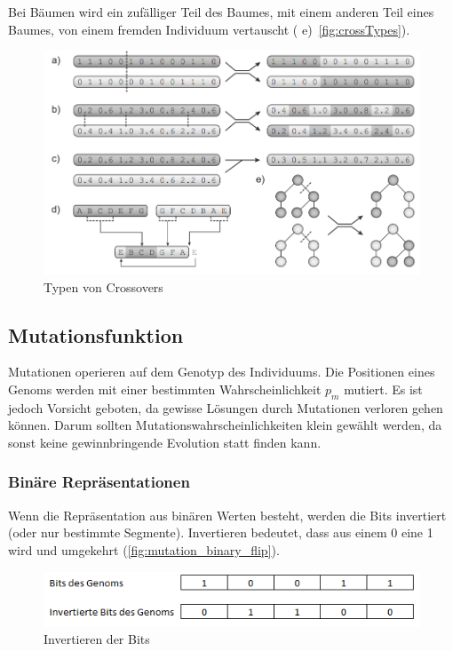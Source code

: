         Bei Bäumen wird ein zufälliger Teil des Baumes, mit einem anderen Teil eines Baumes, von einem fremden Individuum vertauscht ( e)~\vref{fig:crossTypes}).

        \begin{figure}[H]
          \includegraphics[scale=0.7, center]{graphics/crossover_types}
          \caption[\protect{}, S.27]{Typen von Crossovers\label{fig:crossTypes}}
        \end{figure}


    \subsection{Mutationsfunktion}

      Mutationen operieren auf dem Genotyp des Individuums.
      Die Positionen eines Genoms werden mit einer bestimmten Wahrscheinlichkeit \(p_{m}\) mutiert.
      Es ist jedoch Vorsicht geboten, da gewisse Lösungen durch Mutationen verloren gehen können.
      Darum sollten Mutationswahrscheinlichkeiten klein gewählt werden, da sonst keine gewinnbringende Evolution statt finden kann.

      \subsubsection{Binäre Repräsentationen}

        Wenn die Repräsentation aus binären Werten besteht, werden die Bits invertiert (oder nur bestimmte Segmente).
        Invertieren bedeutet, dass aus einem 0 eine 1 wird und umgekehrt (\vref{fig:mutation_binary_flip}).

        \begin{figure}[H]
          \includegraphics[scale=1, center]{graphics/mutation_binary_flip}
          \caption{Invertieren der Bits\label{fig:mutation_binary_flip}}
        \end{figure}

